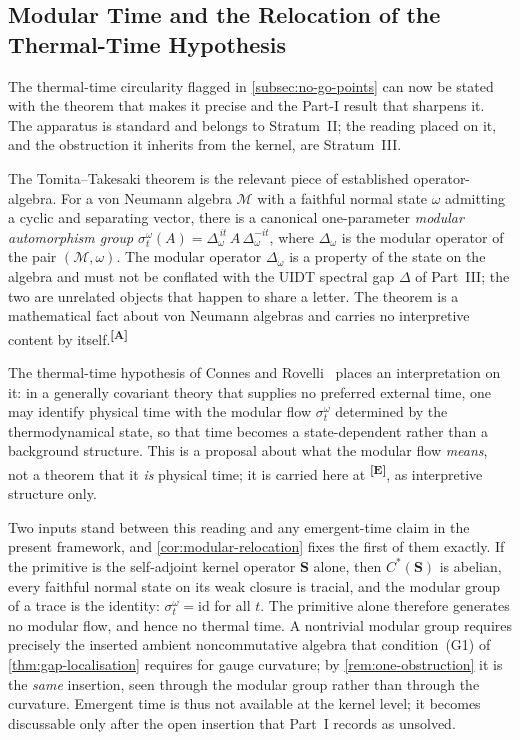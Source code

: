 \documentclass[12pt,a4paper,twoside]{article}
\theoremstyle{plain}
\theoremstyle{definition}
\theoremstyle{remark}
\newcommand{\catmark}[1]{\textsuperscript{\textsf{\textbf{[#1]}}}}
\begin{document}
\subsection{Modular Time and the Relocation of the Thermal-Time Hypothesis}
\label{subsec:modular-time}

The thermal-time circularity flagged in \cref{subsec:no-go-points} can now
be stated with the theorem that makes it precise and the Part-I result that
sharpens it. The apparatus is standard and belongs to Stratum~II; the
reading placed on it, and the obstruction it inherits from the kernel, are
Stratum~III.

The Tomita--Takesaki theorem is the relevant piece of established
operator-algebra. For a von Neumann algebra $\mathcal M$ with a faithful
normal state $\omega$ admitting a cyclic and separating vector, there is a
canonical one-parameter \emph{modular automorphism group}
$\sigma^{\omega}_t(A) = \Delta_\omega^{\,it}\, A\, \Delta_\omega^{-it}$,
where $\Delta_\omega$ is the modular operator of the pair
$(\mathcal M, \omega)$. The modular operator $\Delta_\omega$ is a property
of the state on the algebra and must not be conflated with the UIDT
spectral gap $\Delta$ of Part~III; the two are unrelated objects that
happen to share a letter. The theorem is a mathematical fact about von
Neumann algebras and carries no interpretive content by
itself.\catmark{A}

The thermal-time hypothesis of Connes and
Rovelli~\cite{connesrovelli1994} places an interpretation on it: in a
generally covariant theory that supplies no preferred external time, one
may identify physical time with the modular flow $\sigma^{\omega}_t$
determined by the thermodynamical state, so that time becomes a
state-dependent rather than a background structure. This is a proposal
about what the modular flow \emph{means}, not a theorem that it \emph{is}
physical time; it is carried here at \catmark{E}, as interpretive structure
only.

Two inputs stand between this reading and any emergent-time claim in the
present framework, and \cref{cor:modular-relocation} fixes the first of
them exactly. If the primitive is the self-adjoint kernel operator
$\mathbf S$ alone, then $C^{\ast}(\mathbf S)$ is abelian, every faithful
normal state on its weak closure is tracial, and the modular group of a
trace is the identity: $\sigma^{\omega}_t = \mathrm{id}$ for all $t$. The
primitive alone therefore generates no modular flow, and hence no thermal
time. A nontrivial modular group requires precisely the inserted ambient
noncommutative algebra that condition~(G1) of \cref{thm:gap-localisation}
requires for gauge curvature; by \cref{rem:one-obstruction} it is the
\emph{same} insertion, seen through the modular group rather than through
the curvature. Emergent time is thus not available at the kernel level; it
becomes discussable only after the open insertion that Part~I records as
unsolved.
\end{document}
